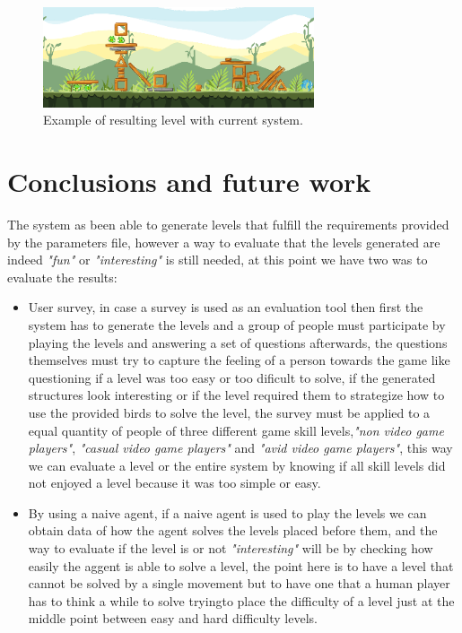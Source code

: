 \documentclass[conference]{IEEEtran}
\begin{document}
\begin{figure}[htbp]
    \centerline{\includegraphics[width=80mm]{Images/Result_n2.png}}
    \caption{Example of resulting level with current system.}
    \label{result_1}
\end{figure}

\section{Conclusions and future work}

The system as been able to generate levels that fulfill the requirements
 provided by the parameters file, however a way to evaluate that the levels
 generated are indeed \textit{"fun"} or \textit{"interesting"} is still needed,
 at this point we have two was to evaluate the results:
 \begin{itemize}
    \item User survey, in case a survey is used as an evaluation tool then first
    the system has to generate the levels and a group of people must participate
    by playing the levels and answering a set of questions afterwards, the
    questions themselves must try to capture the feeling of a person towards the
    game like questioning if a level was too easy or too dificult to solve, if
    the generated structures look interesting or if the level required them to
    strategize how to use the provided birds to solve the level, the survey must
    be applied to a equal quantity of people of three different game skill
    levels,\textit{"non video game players"}, \textit{"casual video game
    players"} and \textit{"avid video game players"}, this way we can evaluate a
    level or the entire system by knowing if all skill levels did not enjoyed a
    level because it was too simple or easy.
    \item By using a naive agent, if a naive agent is used to play the levels we
    can obtain data of how the agent solves the levels placed before them, and
    the way to evaluate if the level is or not \textit{"interesting"} will be by
    checking how easily the aggent is able to solve a level, the point here is
    to have a level that cannot be solved by a single movement but to have one
    that a human player has to think a while to solve tryingto place the
    difficulty of a level just at the middle point between easy and hard
    difficulty levels.
\end{itemize}
\end{document}
